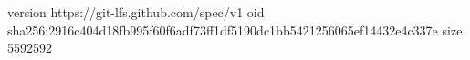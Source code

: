version https://git-lfs.github.com/spec/v1
oid sha256:2916c404d18fb995f60f6adf73ff1df5190dc1bb5421256065ef14432e4c337e
size 5592592
